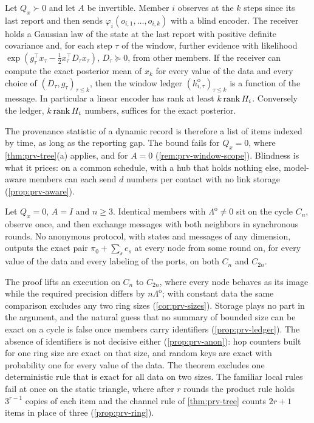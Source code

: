 \begin{theorem}\label{thm:prv-window}
Let $Q_x\succ0$ and let $A$ be invertible. Member $i$ observes at the $k$ steps since its last report and then sends $\varphi_i(o_{i,1},\dots,o_{i,k})$ with a blind encoder. The receiver holds a Gaussian law of the state at the last report with positive definite covariance and, for each step $\tau$ of the window, further evidence with likelihood $\exp(g_\tau^\top x_\tau-\frac12x_\tau^\top D_\tau x_\tau)$, $D_\tau\succeq0$, from other members. If the receiver can compute the exact posterior mean of $x_k$ for every value of the data and every choice of $(D_\tau,g_\tau)_{\tau\le k}$, then the window ledger $(h^{\mathrm o}_{i,\tau})_{\tau\le k}$ is a function of the message. In particular a linear encoder has rank at least $k\operatorname{rank} H_i$. Conversely the ledger, $k\operatorname{rank} H_i$ numbers, suffices for the exact posterior.
\end{theorem}

The provenance statistic of a dynamic record is therefore a list of items indexed by time, as long as the reporting gap. The bound fails for $Q_x=0$, where \cref{thm:prv-tree}(a) applies, and for $A=0$ (\cref{rem:prv-window-scope}). Blindness is what it prices: on a common schedule, with a hub that holds nothing else, model-aware members can each send $d$ numbers per contact with no link storage (\cref{prop:prv-aware}).

\begin{theorem}\label{thm:prv-cover}
Let $Q_x=0$, $A=I$ and $n\ge3$. Identical members with $\Lambda^{\mathrm o}\ne0$ sit on the cycle $C_n$, observe once, and then exchange messages with both neighbors in synchronous rounds. No anonymous protocol, with states and messages of any dimension, outputs the exact pair $\pi_0+\sum_se_s$ at every node from some round on, for every value of the data and every labeling of the ports, on both $C_n$ and $C_{2n}$.
\end{theorem}

The proof lifts an execution on $C_n$ to $C_{2n}$, where every node behaves as its image while the required precision differs by $n\Lambda^{\mathrm o}$; with constant data the same comparison excludes any two ring sizes (\cref{cor:prv-sizes}). Storage plays no part in the argument, and the natural guess that no summary of bounded size can be exact on a cycle is false once members carry identifiers (\cref{prop:prv-ledger}). The absence of identifiers is not decisive either (\cref{prop:prv-anon}): hop counters built for one ring size are exact on that size, and random keys are exact with probability one for every value of the data. The theorem excludes one deterministic rule that is exact for all data on two sizes. The familiar local rules fail at once on the static triangle, where after $r$ rounds the product rule holds $3^{r-1}$ copies of each item and the channel rule of \cref{thm:prv-tree} counts $2r+1$ items in place of three (\cref{prop:prv-ring}).


